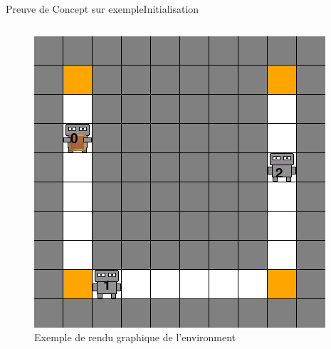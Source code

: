 \begin{frame}[fragile]{Preuve de Concept sur exemple}{Initialisation}
\begin{columns}
        \begin{column}{0.4\textwidth}
            \centering
            \begin{figure}
                \includegraphics[width=\linewidth]{figures/moving_company_v0.png}
                \caption{Exemple de rendu graphique de l'environment }
            \end{figure}
        \end{column}
    
    \end{columns}


\end{frame}

